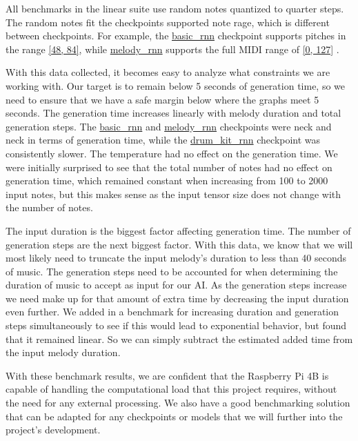 All benchmarks in the linear suite use random notes quantized to quarter steps. The random
notes fit the checkpoints supported note rage, which is different between checkpoints. For
example, the \url{basic_rnn} checkpoint supports pitches in the range \url{[48, 84]},
while \url{melody_rnn} supports the full MIDI range of \url{[0, 127]}
\autocite{modelPitchRange}.

With this data collected, it becomes easy to analyze what constraints we are working
with. Our target is to remain below 5 seconds of generation time, so we need to ensure
that we have a safe margin below where the graphs meet 5 seconds. The generation time
increases linearly with melody duration and total generation steps. The \url{basic_rnn}
and \url{melody_rnn} checkpoints were neck and neck in terms of generation time, while the
\url{drum_kit_rnn} checkpoint was consistently slower. The temperature had no effect on
the generation time. We were initially surprised to see that the total number of notes had
no effect on generation time, which remained constant when increasing from 100 to 2000
input notes, but this makes sense as the input tensor size does not change with the number
of notes.

The input duration is the biggest factor affecting generation time. The number of
generation steps are the next biggest factor. With this data, we know that we will most
likely need to truncate the input melody's duration to less than 40 seconds of music. The
generation steps need to be accounted for when determining the duration of music to accept
as input for our AI. As the generation steps increase we need make up for that amount of
extra time by decreasing the input duration even further. We added in a benchmark for
increasing duration and generation steps simultaneously to see if this would lead to
exponential behavior, but found that it remained linear. So we can simply subtract the
estimated added time from the input melody duration.

With these benchmark results, we are confident that the Raspberry Pi 4B is capable of
handling the computational load that this project requires, without the need for any
external processing. We also have a good benchmarking solution that can be adapted for any
checkpoints or models that we will further into the project's development.

